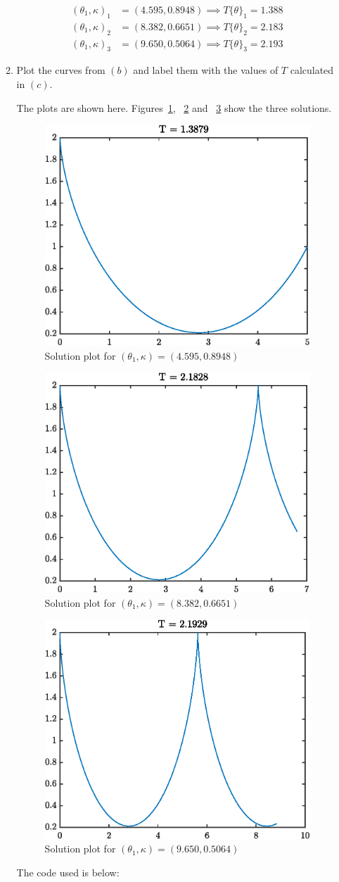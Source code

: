 \documentclass{X:/Documents/Coding/Latex/myassignment}
\begin{document}
\begin{enumerate}
\begin{enumerate}
	\begin{align*}
		(\theta_1,\kappa)_1 &= (4.595,0.8948) \implies T\{\theta\}_1 = 1.388\\
		(\theta_1,\kappa)_2 &= (8.382, 0.6651)\implies T\{\theta\}_2 = 2.183\\
		(\theta_1,\kappa)_3 &= (9.650,0.5064)\implies T\{\theta\}_3 = 2.193
	\end{align*}
	\item Plot the curves from $(b)$ and label them with the values of $T$ calculated in $(c)$.

	The plots are shown here. Figures~\ref{fig:figure1}, ~\ref{fig:figure2} and ~\ref{fig:figure3} show the three solutions.
	\begin{figure}[h]
		\centering
		\includegraphics[width=0.5\linewidth]{Sol1}
		\caption{Solution plot for $(\theta_1,\kappa) = (4.595,0.8948)$}
		\label{fig:figure1}
	\end{figure}
	\begin{figure}[h]
		\centering
		\includegraphics[width=0.5\linewidth]{Sol2}
		\caption{Solution plot for $(\theta_1,\kappa) =(8.382, 0.6651)$}
		\label{fig:figure2}
	\end{figure}
	\begin{figure}[h]
		\centering
		\includegraphics[width=0.5\linewidth]{Sol3}
		\caption{Solution plot for $(\theta_1,\kappa) =(9.650,0.5064)$}
		\label{fig:figure3}
	\end{figure}
	\clearpage
	The code used is below:
	
\end{enumerate}
\end{enumerate}
\end{document}
